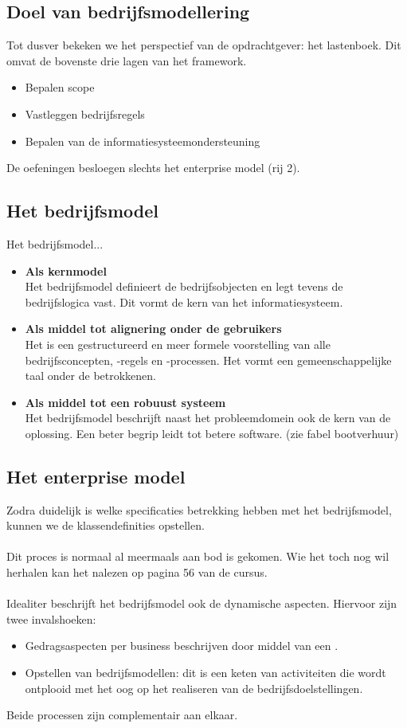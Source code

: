 \documentclass[../../main.tex]{subfiles}
\begin{document}
\subsection{Doel van bedrijfsmodellering}
Tot dusver bekeken we het perspectief van de opdrachtgever: het lastenboek. Dit omvat de bovenste drie lagen van het framework.
\begin{itemize}
	\item Bepalen scope
	\item Vastleggen bedrijfsregels
	\item Bepalen van de informatiesysteemondersteuning
\end{itemize}
De oefeningen besloegen slechts het enterprise model (rij 2).

\subsection{Het bedrijfsmodel}
Het bedrijfsmodel...
\begin{itemize}
	\item \textbf{Als kernmodel} \\
	Het bedrijfsmodel definieert de bedrijfsobjecten en legt tevens de bedrijfslogica vast. Dit vormt de kern van het informatiesysteem.
	\item \textbf{Als middel tot alignering onder de gebruikers} \\
	Het is een gestructureerd en meer formele voorstelling van alle bedrijfsconcepten, -regels en -processen. Het vormt een gemeenschappelijke taal onder de betrokkenen.
	\item \textbf{Als middel tot een robuust systeem} \\
	Het bedrijfsmodel beschrijft naast het probleemdomein ook de kern van de oplossing. Een beter begrip leidt tot betere software. (zie fabel bootverhuur)
\end{itemize}
\subsection{Het enterprise model}
Zodra duidelijk is welke specificaties betrekking hebben met het bedrijfsmodel, kunnen we de klassendefinities opstellen. \\
\\
Dit proces is normaal al meermaals aan bod is gekomen. Wie het toch nog wil herhalen kan het nalezen op pagina 56 van de cursus.\\
\\
Idealiter beschrijft het bedrijfsmodel ook de dynamische aspecten. Hiervoor zijn twee invalshoeken:
\begin{itemize}
	\item Gedragsaspecten per business beschrijven door middel van een  .
	\item Opstellen van bedrijfsmodellen: dit is een keten van activiteiten die wordt ontplooid met het oog op het realiseren van de bedrijfsdoelstellingen.
\end{itemize}
Beide processen zijn complementair aan elkaar.
\end{document}
